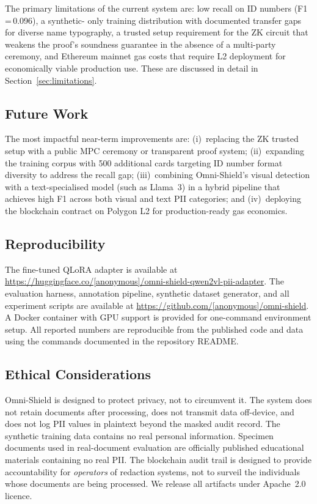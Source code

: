 \documentclass[conference]{IEEEtran}
\begin{document}
The primary limitations of the current system are:
low recall on ID numbers (F1\,=\,0.096), a synthetic-
only training distribution with documented transfer
gaps for diverse name typography, a trusted setup
requirement for the ZK circuit that weakens the
proof's soundness guarantee in the absence of a
multi-party ceremony, and Ethereum mainnet gas costs
that require L2 deployment for economically viable
production use.
These are discussed in detail in
Section~\ref{sec:limitations}.

\subsection*{Future Work}

The most impactful near-term improvements are:
(i)~replacing the ZK trusted setup with a
public MPC ceremony or transparent proof system;
(ii)~expanding the training corpus with 500
additional cards targeting ID number format diversity
to address the recall gap;
(iii)~combining Omni-Shield's visual detection with
a text-specialised model (such as Llama~3) in a
hybrid pipeline that achieves high F1 across both
visual and text PII categories;
and (iv)~deploying the blockchain contract on
Polygon L2 for production-ready gas economics.

\subsection*{Reproducibility}

The fine-tuned QLoRA adapter is available at
\url{https://huggingface.co/[anonymous]/omni-shield-qwen2vl-pii-adapter}.
The evaluation harness, annotation pipeline,
synthetic dataset generator, and all experiment
scripts are available at
\url{https://github.com/[anonymous]/omni-shield}.
A Docker container with GPU support is provided
for one-command environment setup.
All reported numbers are reproducible from the
published code and data using the commands documented
in the repository README.

\subsection*{Ethical Considerations}

Omni-Shield is designed to protect privacy, not
to circumvent it.
The system does not retain documents after
processing, does not transmit data off-device,
and does not log PII values in plaintext beyond
the masked audit record.
The synthetic training data contains no real
personal information.
Specimen documents used in real-document evaluation
are officially published educational materials
containing no real PII.
The blockchain audit trail is designed to provide
accountability for \emph{operators} of redaction
systems, not to surveil the individuals whose
documents are being processed.
We release all artifacts under Apache~2.0 licence.
\end{document}

